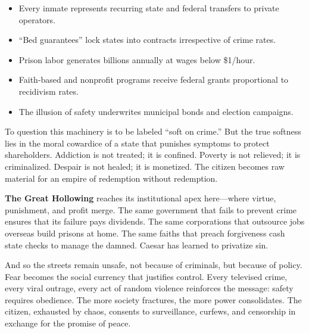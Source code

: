 \documentclass[11pt,twoside]{book}
\begin{document}
\begin{tcolorbox}[
  title=\textbf{The Prison Dividend},
  colback=white,
  colframe=black,
  fonttitle=\bfseries,
  top=0.5mm,
  bottom=0.5mm,
  left=3pt,
  right=3pt,
  before skip=4pt,
  after skip=6pt,
  arc=1mm,
  boxrule=0.4pt
  ]
\setlength{\itemsep}{1pt}
\begin{itemize}
  \item Every inmate represents recurring state and federal transfers to private operators.  
  \item “Bed guarantees” lock states into contracts irrespective of crime rates.  
  \item Prison labor generates billions annually at wages below \$1/hour.  
  \item Faith-based and nonprofit programs receive federal grants proportional to recidivism rates.  
  \item The illusion of safety underwrites municipal bonds and election campaigns.  
\end{itemize}
\end{tcolorbox}

To question this machinery is to be labeled “soft on crime.”  
But the true softness lies in the moral cowardice of a state that punishes symptoms to protect shareholders.  
Addiction is not treated; it is confined.  
Poverty is not relieved; it is criminalized.  
Despair is not healed; it is monetized.  
The citizen becomes raw material for an empire of redemption without redemption.

\textbf{The Great Hollowing} reaches its institutional apex here—where virtue, punishment, and profit merge.  
The same government that fails to prevent crime ensures that its failure pays dividends.  
The same corporations that outsource jobs overseas build prisons at home.  
The same faiths that preach forgiveness cash state checks to manage the damned.  
Caesar has learned to privatize sin.

And so the streets remain unsafe, not because of criminals, but because of policy.  
Fear becomes the social currency that justifies control.  
Every televised crime, every viral outrage, every act of random violence reinforces the message: safety requires obedience.  
The more society fractures, the more power consolidates.  
The citizen, exhausted by chaos, consents to surveillance, curfews, and censorship in exchange for the promise of peace.
\end{document}
